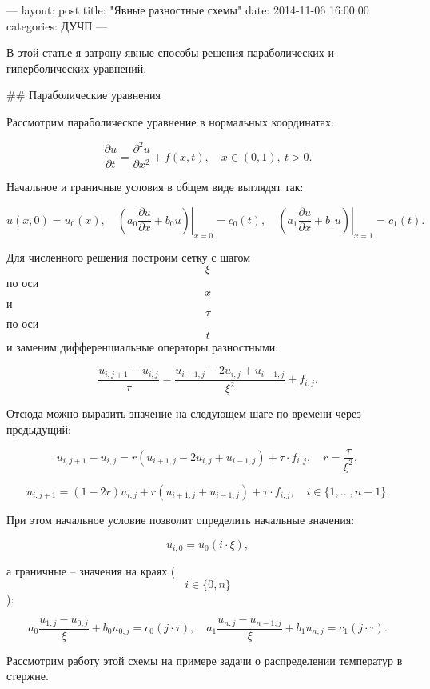 ---
layout: post
title:  "Явные разностные схемы"
date:   2014-11-06 16:00:00
categories: ДУЧП
---

В этой статье я затрону явные способы решения параболических и гиперболических
уравнений.

## Параболические уравнения

Рассмотрим параболическое уравнение в нормальных координатах:

$$
    \frac{\partial u}{\partial t} = \frac{\partial^2 u}{\partial x^2} + f(x, t),
    \quad  x\in(0,1),\ t > 0.
$$

Начальное и граничные условия в общем виде выглядят так:

$$
  u(x, 0) = u_0(x),\quad
  \left.\left(a_0 \frac{\partial u}{\partial x} + b_0 u\right)\right|_{x=0} = c_0(t),
  \quad
  \left.\left(a_1 \frac{\partial u}{\partial x} + b_1 u\right)\right|_{x=1} = c_1(t).
$$

Для численного решения построим сетку с шагом $$ \xi $$ по оси $$ x $$
и $$ \tau $$ по оси $$ t $$ и заменим дифференциальные операторы разностными:

$$
    \frac{u_{i, j+1} - u_{i, j}}{\tau} =
    \frac{u_{i+1, j} - 2u_{i, j} + u_{i-1, j}}{\xi^2} + f_{i, j}.
$$

Отсюда можно выразить значение на следующем шаге по времени через предыдущий:

$$
    u_{i, j+1} - u_{i, j} = r(u_{i+1, j} - 2u_{i, j} + u_{i-1, j}) +
    \tau\cdot f_{i, j},\quad r = \frac{\tau}{\xi^2},
$$

$$
    u_{i, j+1} = (1 - 2r)u_{i, j} + r(u_{i+1, j} + u_{i-1, j})
    + \tau\cdot f_{i, j},\quad i \in \{1,\ldots, n-1\}.
$$

При этом начальное условие позволит определить начальные значения:

$$
    u_{i, 0} = u_0(i \cdot \xi),
$$

а граничные -- значения на краях ($$ i \in \{0, n\} $$):

$$
  a_0 \frac{u_{1, j} - u_{0, j}}{\xi} + b_0 u_{0, j} = c_0(j\cdot\tau),\quad
  a_1 \frac{u_{n, j} - u_{n-1, j}}{\xi} + b_1 u_{n, j} = c_1(j\cdot\tau).
$$

Рассмотрим работу этой схемы на примере задачи о распределении температур в
стержне.

